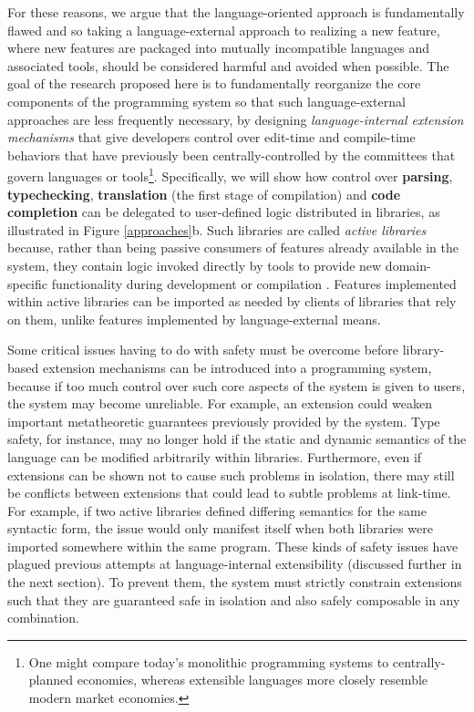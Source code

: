 For these reasons, we argue that the language-oriented approach is fundamentally flawed and so taking a language-external approach to realizing a new feature, where new features are packaged into mutually incompatible languages and associated tools, should be considered harmful and avoided when possible. The goal of the research proposed here is to fundamentally reorganize the core components of the programming system so that such language-external approaches are less frequently necessary, by designing \emph{language-internal extension mechanisms} that give developers control over edit-time and compile-time behaviors that have previously been centrally-controlled by  the  committees that govern languages or tools\footnote{One might compare today's monolithic programming systems to  {centrally-planned} economies, whereas extensible\- languages more closely resemble modern market economies.}. Specifically, we will show how control over \textbf{parsing}, \textbf{typechecking}, \textbf{translation} (the first stage of compilation) and \textbf{code completion} can be delegated to user-defined logic distributed in {libraries}, as illustrated in Figure \ref{approaches}b. Such libraries are called \emph{active libraries} because, rather than being passive consumers of features already available in the system, they contain logic invoked directly by tools to provide new domain-specific functionality during development or compilation \cite{active-libraries}. Features implemented within active libraries can be imported as needed by clients of libraries that rely on them, unlike features implemented by language-external means.

Some critical issues having to do with {safety} must be overcome before library-based extension mechanisms can be introduced into a programming system, because if too much control over such core aspects of the system is given to users, the system may become unreliable. For example, an extension could weaken important metatheoretic guarantees previously provided by the system. Type safety, for instance, may no longer hold if the static and dynamic semantics of the language can be modified arbitrarily within libraries. Furthermore\-, even if extensions can be shown not to cause such problems in isolation, there may still be conflicts between extensions that could lead to subtle problems at link-time. For example, if two active libraries defined differing semantics for the same syntactic form, the issue would only manifest itself when both libraries were imported somewhere within the same program. These kinds of safety issues have plagued previous attempts at language-internal extensibility (discussed further in the next section). To prevent them, the system must strictly constrain extensions such that they are guaranteed safe in isolation and also safely composable in any combination. 

